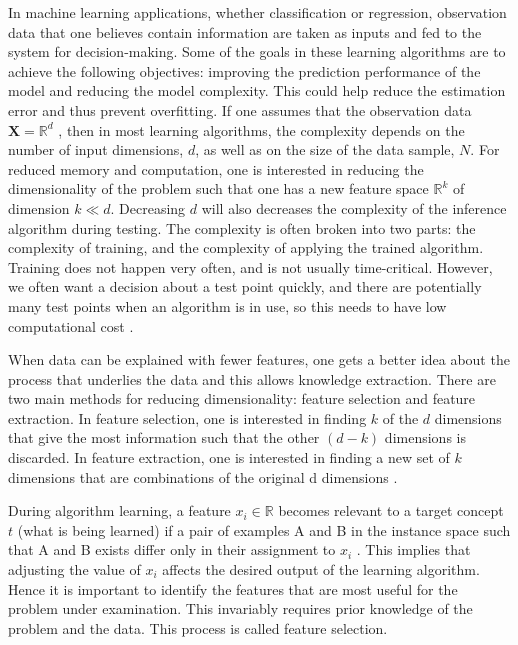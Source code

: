 In machine learning applications, whether classification or regression, observation
data that one believes contain information are taken as inputs and fed
to the system for decision-making. Some of the goals in these learning algorithms are to achieve the following objectives: improving the prediction performance of the model and reducing the model complexity. This could help reduce the estimation error and thus prevent overfitting. If one assumes that the observation data $\textbf{X}=\mathbb{R}^d$ \citep{shalev2014understanding}, then in most learning algorithms, the complexity depends on the number of
input dimensions, $d$, as well as on the size of the data sample, $N$. 
For reduced memory and computation, one is interested in reducing
the dimensionality of the problem such that one has a new feature space $\mathbb{R}^k$ of dimension $k \ll d $. Decreasing $d$ will also decreases the
complexity of the inference algorithm during testing. The
complexity is often broken into two parts: the complexity of training, and the complexity of applying the trained algorithm. Training does not happen very often, and is not usually time-critical. However, we often want a decision about a test point quickly, and there are potentially many test points when an algorithm is in use, so this needs to have low computational cost \citep{marsland2015machine}.

When data can be explained with fewer features, one gets a better idea about the process that underlies the data and this allows knowledge extraction. There are two main methods for reducing dimensionality: feature selection and feature extraction. In feature selection, one is interested in
finding $k$ of the $d$ dimensions that give the most information such that the other $(d - k)$ dimensions is discarded. In feature extraction, one is interested in finding a new set of $k$ dimensions that are combinations of the original d dimensions \citep{alpaydin2014introduction}.
 
During algorithm learning, a feature $x_i\in\mathbb{R}$ becomes relevant to a target concept $t$ (what is being learned) if  a pair of examples A and B in the instance space such that A and B exists differ only in their assignment to  $x_i$ \citep{blum1997selection}. This implies that adjusting the value of $x_i$ affects the desired output of the learning algorithm. Hence it is important to identify the features that are most useful for the problem under examination. This invariably requires prior knowledge of the problem and the data. This process is called feature selection.

